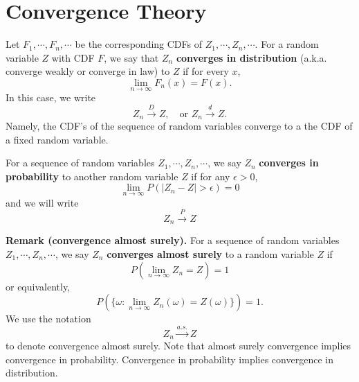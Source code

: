 \documentclass[twoside]{article}
\begin{document}
\section{Convergence Theory}


Let $F_1,\cdots,F_n, \cdots$ be the corresponding CDFs of $Z_1,\cdots, Z_n,\cdots $.
For a random variable $Z$ with CDF $F$, we say that
$Z_n$ {\bf converges in distribution} (a.k.a. converge weakly or converge in law) to $Z$ if for every $x$,
$$
\lim_{n\rightarrow \infty}F_n(x) = F(x).
$$
In this case, we write
$$
Z_n\overset{D}{\rightarrow} Z,\quad \mbox{or } Z_n\overset{d}{\rightarrow} Z.
$$
Namely, the CDF's of the sequence of random variables converge to
a the CDF of a fixed random variable.  


For a sequence of random variables $Z_1,\cdots,Z_n,\cdots$,
we say $Z_n$ {\bf converges in probability} to another random variable $Z$
if for any $\epsilon>0$,
$$
\lim_{n\rightarrow \infty}P(|Z_n-Z|>\epsilon) = 0
$$
and we will write
$$
Z_n\overset{P}{\rightarrow} Z
$$




{\bf Remark (convergence almost surely).}
For a sequence of random variables $Z_1,\cdots,Z_n,\cdots$,
we say $Z_n$ {\bf converges almost surely} to a random variable $Z$
if
$$
P(\lim_{n\rightarrow\infty} Z_n=Z) = 1
$$
or equivalently,
$$
P(\{\omega: \lim_{n\rightarrow\infty} Z_n(\omega)=Z(\omega)\}) = 1.
$$
We use the notation
$$
Z_n\overset{a.s.}{\rightarrow} Z
$$
to denote convergence almost surely. 
Note that almost surely convergence implies convergence in probability.
Convergence in probability implies convergence in distribution. 
\end{document}
